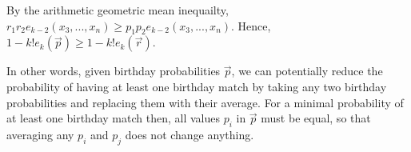 \begin{enumerate}[label=(\alph*)]
  By the arithmetic geometric mean inequailty, $r_{1}r_{2}e_{k-2}(x_{3},...,x_{n}) \geq p_{1}p_{2}e_{k-2}(x_{3},...,x_{n})$. Hence, $1 - k!e_{k}(\overrightarrow{p}) \geq 1 - k!e_{k}(\overrightarrow{r})$.

  In other words, given birthday probabilities $\overrightarrow{p}$, we can potentially reduce the probability of having at least one birthday match by taking any two birthday probabilities and replacing them with their average. For a minimal probability of at least one birthday match then, all  values $p_{i}$ in $\overrightarrow{p}$ must be equal, so that averaging any $p_{i}$ and $p_{j}$ does not change anything. 


\end{enumerate}
